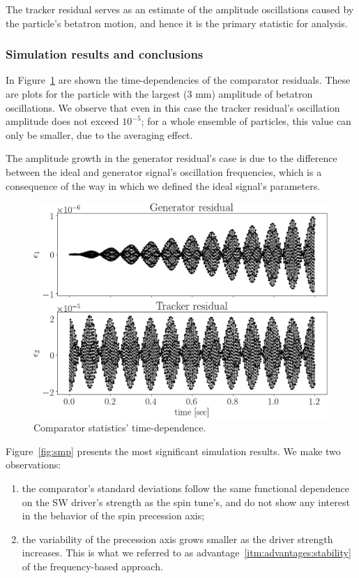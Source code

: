 \documentclass[]{elsarticle}
\begin{document}
The tracker residual serves as an estimate of the amplitude oscillations
caused by the particle's betatron motion, and hence it is the primary statistic for analysis.

\subsubsection{Simulation results and conclusions}

In Figure~\ref{fig:smp:resid_vs_time} are shown the time-dependencies of the comparator
residuals. These are plots for the particle with the largest (3 mm) amplitude of betatron oscillations.
We observe that even in this case the tracker residual's oscillation amplitude does not exceed
$10^{-5}$; for a whole ensemble of particles, this value can only be smaller, due to the averaging effect.

The amplitude growth in the generator residual's case is due to the difference between the ideal
and generator signal's oscillation frequencies, which is a consequence of the way in which we defined the
ideal signal's parameters.
\begin{figure}[h]
  \includegraphics[width=\linewidth]{img/smp_sim/residual_vs_time(both)}
  \caption{Comparator statistics' time-dependence.\label{fig:smp:resid_vs_time}}
\end{figure}

Figure~\ref{fig:smp} presents the most significant simulation results. We make two observations:
\begin{enumerate}[(1)]
\item the comparator's standard deviations follow the same functional dependence on the SW driver's
  strength as the spin tune's, and do not show any interest in the behavior of the spin precession axis;
\item the variability of the precession axis grows smaller as the driver strength increases. This is
  what we referred to as advantage~\ref{itm:advantages:stability} of the frequency-based approach.
\end{enumerate}
\end{document}
